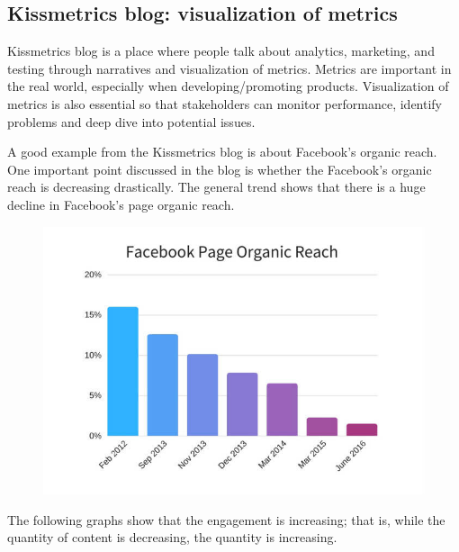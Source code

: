 \documentclass[]{book}
\theoremstyle{definition}
\theoremstyle{definition}
\theoremstyle{definition}
\theoremstyle{remark}
\begin{document}
\subsection{Kissmetrics blog: visualization of
metrics}\label{kissmetrics-blog-visualization-of-metrics}

\citep{facebook_organic} Kissmetrics blog is a place where people talk
about analytics, marketing, and testing through narratives and
visualization of metrics. Metrics are important in the real world,
especially when developing/promoting products. Visualization of metrics
is also essential so that stakeholders can monitor performance, identify
problems and deep dive into potential issues.

A good example from the Kissmetrics blog is about Facebook's organic
reach. One important point discussed in the blog is whether the
Facebook's organic reach is decreasing drastically. The general trend
shows that there is a huge decline in Facebook's page organic reach.

\begin{figure}
\centering
\includegraphics{images/facebook-page-organic-reach-decline-over-years.jpg}
\caption{}
\end{figure}

The following graphs show that the engagement is increasing; that is,
while the quantity of content is decreasing, the quantity is increasing.
\end{document}
